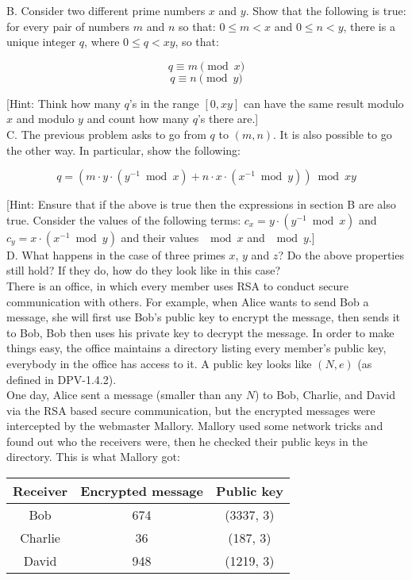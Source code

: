 \documentclass{article}
\begin{document}
\noindent B. Consider two different prime numbers $x$ and $y$. Show that the
following is true: for every pair of numbers $m$ and $n$ so that: $0
\leq m < x$ and $0 \leq n < y$, there is a unique integer $q$, where
$0 \leq q < xy$, so that:

$$q \equiv m \pmod{x}$$
$$q \equiv n \pmod{y}$$

[Hint: Think how many $q$'s in the range $[0,xy]$ can have the same
  result modulo $x$ and modulo $y$ and count how many $q$'s there
  are.]\\
  
\noindent C. The previous problem asks to go from $q$ to $(m,n)$. It is also
possible to go the other way. In particular, show the following:

$$q = ( m \cdot y \cdot (y^{-1} \bmod{x}) + n \cdot x \cdot
(x^{-1} \bmod{y}) ) \bmod{xy}$$

[Hint: Ensure that if the above is true then the expressions in section B are
  also true. Consider the values of the following terms: $c_x = y
  \cdot (y^{-1} \bmod{x})$ and $c_y = x \cdot (x^{-1} \bmod{y})$ and
their values $\mod{x}$ and $\mod{y}$.]\\

\noindent D. What happens in the case of three primes $x$, $y$ and $z$? Do the
above properties still hold? If they do, how do they look like in this
case?\\
  
 There is an office, in which every member
uses RSA to conduct secure communication with others.  For example,
when Alice wants to send Bob a message, she will first use Bob's
public key to encrypt the message, then sends it to Bob, Bob then uses
his private key to decrypt the message.  In order to make things easy,
the office maintains a directory listing every member's public key,
everybody in the office has access to it. A public key looks like $(N,
e)$ (as defined in DPV-1.4.2).\\

\noindent One day, Alice sent a message (smaller than any $N$) to Bob,
Charlie, and David via the RSA based secure communication, but the
encrypted messages were intercepted by the webmaster Mallory. Mallory
used some network tricks and found out who the receivers were, then he
checked their public keys in the directory. This is what Mallory got:

\begin{center}
  \begin{tabular}{ | c | c | c | }
    \hline
    Receiver & Encrypted message & Public key \\ \hline
    Bob & 674 & (3337, 3) \\
    Charlie & 36 & (187, 3) \\
    David & 948 & (1219, 3) \\
    \hline
  \end{tabular}
\end{center}
\end{document}
